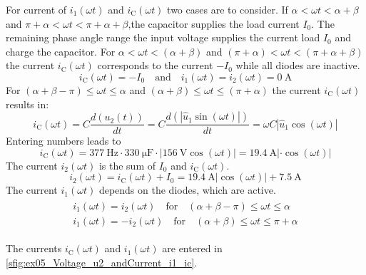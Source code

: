 \begin{solutionblock}
    For current of $i_\mathrm{1}(\omega t)$ and  $i_\mathrm{C}(\omega t)$ two cases are to consider. If $\alpha<\omega t<\alpha+\beta$
    and $\pi+\alpha<\omega t<\pi+\alpha+\beta$,the capacitor supplies the load current $I_{\mathrm{0}}$.
    The remaining phase angle range the input voltage supplies the current load $I_{\mathrm{0}}$ and charge the capacitor.
    For $\alpha<\omega t<(\alpha+\beta)$ and $(\pi+\alpha)<\omega t<(\pi+\alpha+\beta)$ the current $i_\mathrm{C}(\omega t)$ 
    corresponds to the current $-I_{\mathrm{0}}$ while all diodes are inactive.
    \begin{equation} 
        i_\mathrm{C}(\omega t)=-I_{\mathrm{0}} \quad \text{and} \quad i_\mathrm{1}(\omega t)= i_\mathrm{2}(\omega t)= \SI{0}{\ampere}
    \end{equation}
    For $(\alpha+\beta-\pi)\leq\omega t\leq\alpha$ and $(\alpha+\beta)\leq\omega t\leq(\pi+\alpha)$ the current $i_\mathrm{C}(\omega t)$ results in:
    \begin{equation} 
        i_\mathrm{C}(\omega t)=C\frac{d(u_\mathrm{2}(t))}{dt}=C\frac{d(\left| \hat{u}_\mathrm{1}\sin(\omega t)\right|)}{dt}
        = \omega C \left|\hat{u}_\mathrm{1}\cos(\omega t)\right| 
    \end{equation}
    Entering numbers leads to
    \begin{equation} 
        i_\mathrm{C}(\omega t)= \SI{377}{\hertz} \cdot \SI{330}{\micro\farad} \cdot  \left|\SI{156}{\volt}\cos(\omega t)\right|
        =\SI{19.4}{\ampere}\left| \cdot \cos(\omega t)\right| 
    \end{equation}
    The current $i_\mathrm{2}(\omega t)$ is the sum of $I_{\mathrm{0}}$ and $i_\mathrm{C}(\omega t)$.
    \begin{equation} 
        i_\mathrm{2}(\omega t)=i_\mathrm{C}(\omega t) + I_{\mathrm{0}}=\SI{19.4}{\ampere}\left|\cos(\omega t)\right| + \SI{7.5}{\ampere}
    \end{equation}
    The current $i_\mathrm{1}(\omega t)$ depends on the diodes, which are active.
    \begin{align}
        \begin{split}
            i_\mathrm{1}(\omega t)=i_\mathrm{2}(\omega t) \quad \text{for} \quad (\alpha+\beta-\pi)\leq\omega t\leq\alpha \\
            i_\mathrm{1}(\omega t)=-i_\mathrm{2}(\omega t) \quad \text{for} \quad (\alpha+\beta)\leq\omega t\leq\pi+\alpha
        \end{split}
    \end{align}

    The currents $i_\mathrm{C}(\omega t)$ and $i_\mathrm{1}(\omega t)$ are entered in \autoref{sfig:ex05_Voltage_u2_andCurrent_i1_ic}.

\end{solutionblock}

